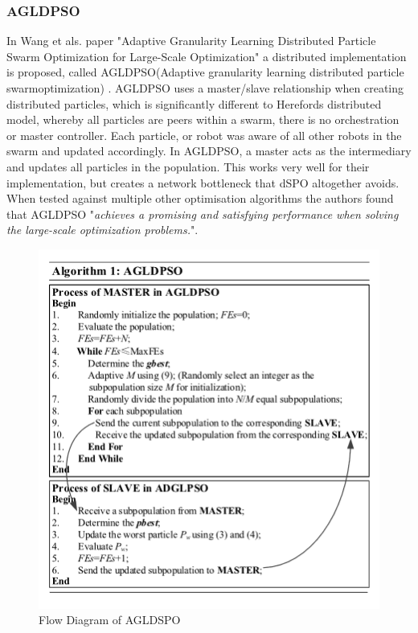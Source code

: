 \documentclass[oneside,12pt]{book}
\begin{document}
\subsubsection{AGLDPSO}
In Wang et als. paper "Adaptive Granularity Learning Distributed Particle Swarm Optimization for Large-Scale Optimization" a distributed implementation is proposed, called AGLDPSO(Adaptive granularity learning distributed particle swarmoptimization) \cite{wang2020adaptive}. AGLDPSO uses a master/slave relationship when creating distributed particles, which is significantly different to Herefords distributed model, whereby all particles are peers within a swarm, there is no orchestration or master controller. Each particle, or robot was aware of all other robots in the swarm and updated accordingly. In AGLDPSO, a master acts as the intermediary and updates all particles in the population. This works very well for their implementation, but creates a network bottleneck that dSPO altogether avoids. When tested against multiple other optimisation algorithms the authors found that AGLDPSO "\textit{achieves a promising and satisfying performance when solving the large-scale optimization problems.}". 
\begin{figure}[H]
    \centering
    \includegraphics[scale=0.8]{Images/AGLDPSO.png}
    \caption{Flow Diagram of AGLDSPO \protect\cite{wang2020adaptive} }
    \label{fig:Flow Diagram of AGLDSPO}
\end{figure}
\end{document}
